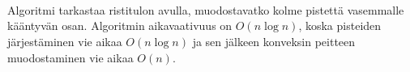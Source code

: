 \\\\\\
\indent
Algoritmi tarkastaa ristitulon avulla,
muodostavatko kolme pistettä vasemmalle
kääntyvän osan.
Algoritmin aikavaativuus on $O(n \log n)$,
koska pisteiden järjestäminen vie aikaa $O(n \log n)$
ja sen jälkeen konveksin peitteen muodostaminen
vie aikaa $O(n)$.




